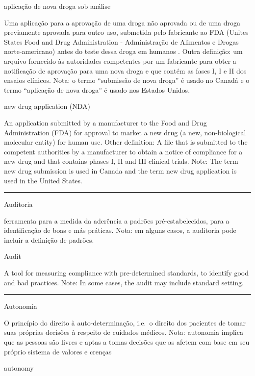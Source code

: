 \documentclass[
]{book}
\begin{document}
aplicação de nova droga sob análise

Uma aplicação para a aprovação de uma droga não aprovada ou de uma droga previamente aprovada para outro uso, submetida pelo fabricante ao FDA (Unites States Food and Drug Administration - Administração de Alimentos e Drogas norte-americano) antes do teste dessa droga em humanos . Outra definição: um arquivo fornecido às autoridades competentes por um fabricante para obter a notificação de aprovação para uma nova droga e que contém as fases I, I e II dos ensaios clínicos. Nota: o termo ``submissão de nova droga'' é usado no Canadá e o termo ``aplicação de nova droga'' é usado nos Estados Unidos.

new drug application (NDA)

An application submitted by a manufacturer to the Food and Drug Administration (FDA) for approval to market a new drug (a new, non-biological molecular entity) for human use. Other definition: A file that is submitted to the competent authorities by a manufacturer to obtain a notice of compliance for a new drug and that contains phases I, II and III clinical trials. Note: The term new drug submission is used in Canada and the term new drug application is used in the United States.

\begin{center}\rule{0.5\linewidth}{0.5pt}\end{center}

Auditoria

ferramenta para a medida da aderência a padrões pré-estabelecidos, para a identificação de boas e más práticas. Nota: em alguns casos, a auditoria pode incluir a definição de padrões.

Audit

A tool for measuring compliance with pre-determined standards, to identify good and bad practices. Note: In some cases, the audit may include standard setting.

\begin{center}\rule{0.5\linewidth}{0.5pt}\end{center}

Autonomia

O princípio do direito à auto-determinação, i.e.~o direito dos pacientes de tomar suas próprias decisões à respeito de cuidados médicos. Nota: autonomia implica que as pessoas são livres e aptas a tomas decisões que as afetem com base em seu próprio sistema de valores e crenças

autonomy
\end{document}
